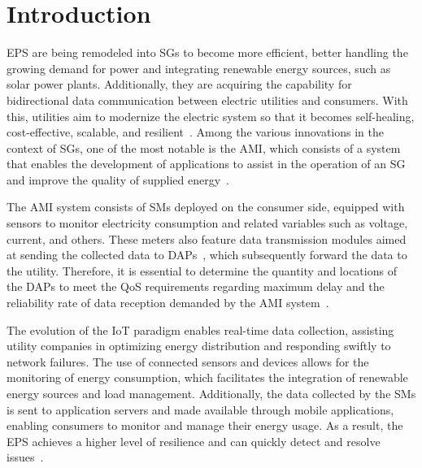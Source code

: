 \documentclass[a4paper,fleqn]{cas-dc}
\begin{document}
\maketitle

\section{Introduction} \label{sec:introduction}

\gls{EPS} are being remodeled into \gls{SGs} to become more efficient, better handling the growing demand for power and integrating renewable energy sources, such as solar power plants. Additionally, they are acquiring the capability for bidirectional data communication between electric utilities and consumers. With this, utilities aim to modernize the electric system so that it becomes self-healing, cost-effective, scalable, and resilient~\cite{marques2023analysis}. Among the various innovations in the context of SGs, one of the most notable is the \gls{AMI}, which consists of a system that enables the development of applications to assist in the operation of an SG and improve the quality of supplied energy~\cite{ruuth2023sg, smolenski2022advanced}.

The \gls{AMI} system consists of \gls{SMs} deployed on the consumer side, equipped with sensors to monitor electricity consumption and related variables such as voltage, current, and others. These meters also feature data transmission modules aimed at sending the collected data to \gls{DAPs}~\cite{pradeep2023sg}, which subsequently forward the data to the utility. Therefore, it is essential to determine the quantity and locations of the \gls{DAPs} to meet the \gls{QoS} requirements regarding maximum delay and the reliability rate of data reception demanded by the \gls{AMI} system~\cite{khan2021qos}.

The evolution of the \gls{IoT} paradigm enables real-time data collection, assisting utility companies in optimizing energy distribution and responding swiftly to network failures. The use of connected sensors and devices allows for the monitoring of energy consumption, which facilitates the integration of renewable energy sources and load management. Additionally, the data collected by the \gls{SMs} is sent to application servers and made available through mobile applications, enabling consumers to monitor and manage their energy usage. As a result, the \gls{EPS} achieves a higher level of resilience and can quickly detect and resolve issues~\cite{myoung2023data}.
\end{document}
